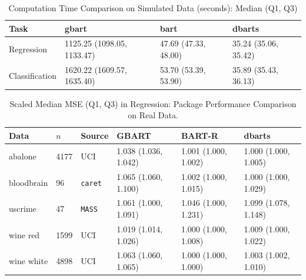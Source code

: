 \documentclass[12pt]{article}
\newcommand{\1}{\mathbb{I}}
\theoremstyle{plain}
\theoremstyle{definition}
\theoremstyle{remark}
\begin{document}
\begin{table}[ht]
\centering
\caption{Computation Time Comparison on Simulated Data (seconds): Median (Q1, Q3)}
\label{tab:compute_time}
\begin{tabular}{@{}llll@{}}
\toprule
Task           & gbart                      & bart                 & dbarts              \\ \midrule
Regression     & 1125.25 (1098.05, 1133.47) & 47.69 (47.33, 48.00) & 35.24 (35.06, 35.42) \\
Classification & 1620.22 (1609.57, 1635.40) & 53.70 (53.39, 53.90) & 35.89 (35.43, 36.13) \\ \bottomrule
\end{tabular}
\end{table}

\begin{table}
\centering
\caption{Scaled Median MSE (Q1, Q3) in Regression: Package Performance Comparison on Real Data.}
\label{tab:regression_datasets}
\begin{tabular}{@{}llllll@{}}
\toprule
Data       & $n$  & Source  & GBART                & BART-R               & dbarts               \\ \midrule
abalone    & 4177 & UCI     & 1.038 (1.036, 1.042) & 1.001 (1.000, 1.002) & 1.000 (1.000, 1.005) \\
bloodbrain & 96   & \texttt{caret}   & 1.065 (1.060, 1.100) & 1.002 (1.000, 1.015) & 1.000 (1.000, 1.029) \\
uscrime    & 47   & \texttt{MASS}    & 1.061 (1.000, 1.091) & 1.046 (1.000, 1.231) & 1.099 (1.078, 1.148) \\
wine red   & 1599 & UCI     & 1.019 (1.014, 1.026) & 1.000 (1.000, 1.008) & 1.009 (1.000, 1.022) \\
wine white & 4898 & UCI     & 1.063 (1.060, 1.065) & 1.000 (1.000, 1.000) & 1.003 (1.002, 1.010) \\ \bottomrule
\end{tabular}
\end{table}
\end{document}
